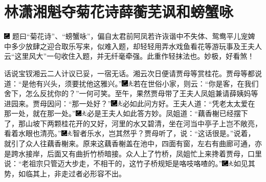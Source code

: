 

\chapter{林潇湘魁夺菊花诗\hspace{.5em}薛蘅芜讽和螃蟹咏}

{\includegraphics[width=3mm]{../Images/00003}  \kaishu 题曰“菊花诗”、“螃蟹咏”，偏自太君前阿凤若许诙谐中不失体、鸳鸯平儿宠婢中多少放肆之迎合取乐写来，似难入题，却轻轻用弄水戏鱼看花等游玩事及王夫人云“这里风大”一句收住入题，并无纤毫牵强。此重作轻抹法也。妙极，好看煞！}

话说宝钗湘云二人计议已妥，一宿无话。湘云次日便请贾母等赏桂花。贾母等都说道：“是他有兴头，须要扰他这雅兴。”{\includegraphics[width=3mm]{../Images/00003}\includegraphics[width=3mm]{../Images/00012}\footnotesize \kaishu 若在世俗小家，则云：“你是客，在我们舍下，怎么反扰你的？”一何可笑。}至午，果然贾母带了王夫人凤姐兼请薛姨妈等进园来。贾母因问：“那一处好？”{\includegraphics[width=3mm]{../Images/00003}\includegraphics[width=3mm]{../Images/00012}\footnotesize \kaishu 必如此问方好。}王夫人道：“凭老太太爱在那一处，就在那一处。”{\includegraphics[width=3mm]{../Images/00003}\includegraphics[width=3mm]{../Images/00012}\footnotesize \kaishu 必是王夫人如此答方妙。}凤姐道：“藕香榭已经摆下了，那山坡下两颗桂花开的又好，河里的水又碧清，坐在河当中亭子上岂不敞亮，看着水眼也清亮。”{\includegraphics[width=3mm]{../Images/00003}\includegraphics[width=3mm]{../Images/00012}\footnotesize \kaishu 智者乐水，岂其然乎？}贾母听了，说：“这话很是。”说着，就引了众人往藕香榭来。原来这藕香榭盖在池中，四面有窗，左右有曲廊可通，亦是跨水接岸，后面又有曲折竹桥暗接。众人上了竹桥，凤姐忙上来搀着贾母，口里说：“老祖宗只管迈大步走，不相干的，这竹子桥规矩是咯吱咯喳的。”{\includegraphics[width=3mm]{../Images/00003}\includegraphics[width=3mm]{../Images/00012}\footnotesize \kaishu 如见其势，如临其上，非走过者必形容不出。}

